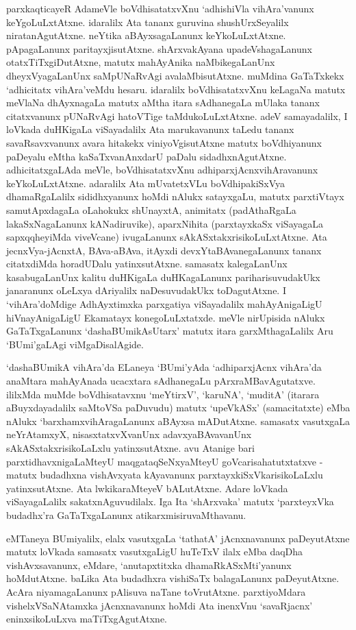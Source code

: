 parxkaqticayeR AdameVle boVdhisatatxvXnu `adhishiVla vihAra'vanunx keYgoLuLxtAtxne. idaralilx Ata tananx guruvina shushUrxSeyalilx niratanAgutAtxne. neYtika aBAyxsagaLanunx keYkoLuLxtAtxne. pApagaLanunx paritayxjisutAtxne. shArxvakAyana upadeVshagaLanunx otatxTiTxgiDutAtxne, matutx mahAyAnika naMbikegaLanUnx dheyxVyagaLanUnx saMpUNaRvAgi avalaMbisutAtxne. muMdina GaTaTxkekx `adhicitatx vihAra'veMdu hesaru. idaralilx boVdhisatatxvXnu keLagaNa matutx meVlaNa dhAyxnagaLa matutx aMtha itara sAdhanegaLa mUlaka tananx citatxvanunx pUNaRvAgi hatoVTige taMdukoLuLxtAtxne. adeV samayadalilx, I loVkada duHKigaLa viSayadalilx Ata marukavanunx taLedu tananx savaRsavxvanunx avara hitakekx viniyoVgisutAtxne matutx boVdhiyanunx paDeyalu eMtha kaSaTxvanAnxdarU paDalu sidadhxnAgutAtxne. adhicitatxgaLAda meVle, boVdhisatatxvXnu adhiparxjAcnxvihAravanunx keYkoLuLxtAtxne. adaralilx Ata mUvatetxVLu boVdhipakiSxVya dhamaRgaLalilx sididhxyanunx hoMdi nAlukx satayxgaLu, matutx parxtiVtayx samutApxdagaLa oLahokukx shUnayxtA, animitatx (padAthaRgaLa lakaSxNagaLanunx kANadiruvike), aparxNihita (parxtayxkaSx viSayagaLa sapxqqheyiMda viveVcane) ivugaLanunx sAkASxtakxrisikoLuLxtAtxne. Ata jecnxVya-jAcnxtA, BAva-aBAva, itAyxdi devxYtaBAvanegaLanunx tananx citatxdiMda horadUDalu yatinxsutAtxne. samasatx kalegaLanUnx kasabugaLanUnx kalitu duHKigaLa duHKagaLanunx pariharisuvudakUkx janaranunx oLeLxya dAriyalilx naDesuvudakUkx toDagutAtxne. I `vihAra'doMdige AdhAyxtimxka parxgatiya viSayadalilx mahAyAnigaLigU hiVnayAnigaLigU Ekamatayx konegoLuLxtatxde. meVle nirUpisida nAlukx GaTaTxgaLanunx `dashaBUmikAsUtarx' matutx itara garxMthagaLalilx Aru `BUmi'gaLAgi viMgaDisalAgide.

`dashaBUmikA vihAra'da ELaneya `BUmi'yAda `adhiparxjAcnx vihAra'da anaMtara mahAyAnada ucacxtara sAdhanegaLu pArxraMBavAgutatxve. ililxMda muMde boVdhisatavxnu `meYtirxV', `karuNA', `muditA' (itarara aBuyxdayadalilx saMtoVSa paDuvudu) matutx `upeVkASx' (samacitatxte) eMba nAlukx `barxhamxvihAragaLanunx aBAyxsa mADutAtxne. samasatx vasutxgaLa neYrAtamxyX, nisasxtatxvXvanUnx  adavxyaBAvavanUnx sAkASxtakxrisikoLaLxlu yatinxsutAtxne. avu Atanige bari parxtidhavxnigaLaMteyU maqgataqSeNxyaMteyU goVcarisahatutxtatxve - matutx budadhxna vishAvxyata kAyavanunx parxtayxkiSxVkarisikoLaLxlu yatinxsutAtxne. Ata lwkikaraMteyeV bALutAtxne. Adare loVkada viSayagaLalilx sakatxnAguvudilalx. Iga Ita `shArxvaka' matutx `parxteyxVka budadhx'ra GaTaTxgaLanunx atikarxmisiruvaMthavanu.

eMTaneya BUmiyalilx, elalx vasutxgaLa `tathatA' jAcnxnavanunx paDeyutAtxne matutx loVkada samasatx vasutxgaLigU huTeTxV ilalx eMba daqDha vishAvxsavanunx, eMdare, `anutapxtitxka dhamaRkASxMti'yanunx hoMdutAtxne. baLika Ata budadhxra vishiSaTx balagaLanunx paDeyutAtxne. AcAra niyamagaLanunx pAlisuva naTane toVrutAtxne. parxtiyoMdara vishelxVSaNAtamxka jAcnxnavanunx hoMdi Ata inenxVnu `savaRjacnx' eninxsikoLuLxva maTiTxgAgutAtxne.


